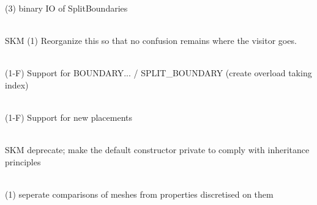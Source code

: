 \begin{DoxyRefList}
(3)  binary IO of Split\+Boundaries  
\item[Member \doxylink{classcsmp_1_1_model_a2e12f259012989765f3269d8ea721092}{csmp\+::Model\texorpdfstring{$<$}{<} dim \texorpdfstring{$>$}{>}\+::Accept} (\doxylink{classcsmp_1_1_visitor}{csmp\+::\+Visitor$<$ dim $>$} \&)]\hfill \\
\label{todo__todo000167}%
%
SKM (1) Reorganize this so that no confusion remains where the visitor goes.  
\item[Member \doxylink{classcsmp_1_1_model_aff7668a969afb1b8934e63a27b47ca31}{csmp\+::Model\texorpdfstring{$<$}{<} dim \texorpdfstring{$>$}{>}\+::Create\+Property} (const char \texorpdfstring{$\ast$}{*}new\+\_\+prop, const char \texorpdfstring{$\ast$}{*}notation, const char \texorpdfstring{$\ast$}{*}unit, \doxylink{group___c_s_m_p__global__enumerations_gacbf62c758c46dc45b3f024638bb89274}{VARIABLE\+\_\+\+TYPE} type=SCALAR, \doxylink{group___c_s_m_p__global__enumerations_gac35734252a71b0a9768a54a364137cf8}{PLACEMENT} place=NODE, uint32\+\_\+t vsize=1, double vmin=-\/1.\+0e+30, double vmax=1.\+0e+30, std\+::string usage="{}???"{})]\hfill \\
\label{todo__todo000165}%
%
(1-\/F) Support for BOUNDARY... / SPLIT\+\_\+\+BOUNDARY (create overload taking index)  
\item[Member \doxylink{classcsmp_1_1_model_a6c9c1075f4048ab03276569f580fce19}{csmp\+::Model\texorpdfstring{$<$}{<} dim \texorpdfstring{$>$}{>}\+::Delete\+Property} (const char \texorpdfstring{$\ast$}{*}property)]\hfill \\
\label{todo__todo000166}%
%
(1-\/F) Support for new placements  
\item[Member \doxylink{classcsmp_1_1_model_a0c9c473b8a6341e01a0efe65b9f4b2fe}{csmp\+::Model\texorpdfstring{$<$}{<} dim \texorpdfstring{$>$}{>}\+::Model} ()]\hfill \\
\label{todo__todo000164}%
%
SKM deprecate; make the default constructor private to comply with inheritance principles  
\item[Class \doxylink{classcsmp_1_1_model_comparator}{csmp\+::Model\+Comparator\texorpdfstring{$<$}{<} dim \texorpdfstring{$>$}{>}} ]\hfill \\
\label{todo__todo000238}%
%
(1) seperate comparisons of meshes from properties discretised on them 




\end{DoxyRefList}
